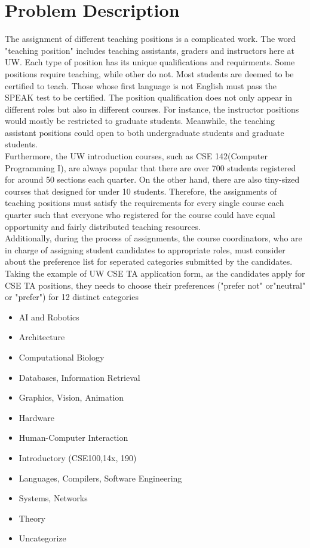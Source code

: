 \documentclass[twoside,twocolumn]{article}
\begin{document}
    \section{Problem Description}
    The assignment of different teaching positions is a complicated work. The word "teaching position" 
    includes teaching assistants, graders and instructors here at UW. Each type of position has its 
    unique qualifications and requirments. Some positions require teaching, while other do not. 
    Most students are deemed to be certified to teach. Those whose first language is not English must 
    pass the SPEAK test to be certified. The position qualification does not only appear in different roles 
    but also in different courses. For instance, the instructor positions would mostly be restricted to 
    graduate students. Meanwhile, the teaching assistant positions could open to both undergraduate students and 
    graduate students.
    \\ Furthermore, the UW introduction courses, such as CSE 142(Computer Programming I), are always popular 
    that there are over 700 students registered for around 50 sections each quarter. On the other hand, there are 
    also tiny-sized courses that designed for under 10 students. Therefore, the assignments of teaching positions 
    must satisfy the requirements for every single course each quarter such that everyone who registered for the course
    could have equal opportunity and fairly distributed teaching resources.   
    \\ Additionally, during the process of assignments, the course coordinators, who are in charge of assigning student candidates
    to appropriate roles, must consider about the preference list for seperated categories submitted by the candidates. Taking
    the example of UW CSE TA application form, as the candidates apply for CSE TA positions, they needs to choose their preferences 
    ("prefer not" or"neutral" or "prefer") for 12 distinct categories
    \begin{itemize}
        \item AI and Robotics			
        \item Architecture			
        \item Computational Biology			
        \item Databases, Information Retrieval			
        \item Graphics, Vision, Animation			
        \item Hardware			
        \item Human-Computer Interaction			
        \item Introductory (CSE100,14x, 190)			
        \item Languages, Compilers, Software Engineering			
        \item Systems, Networks
        \item Theory			
        \item Uncategorize
    \end{itemize}
\end{document}
